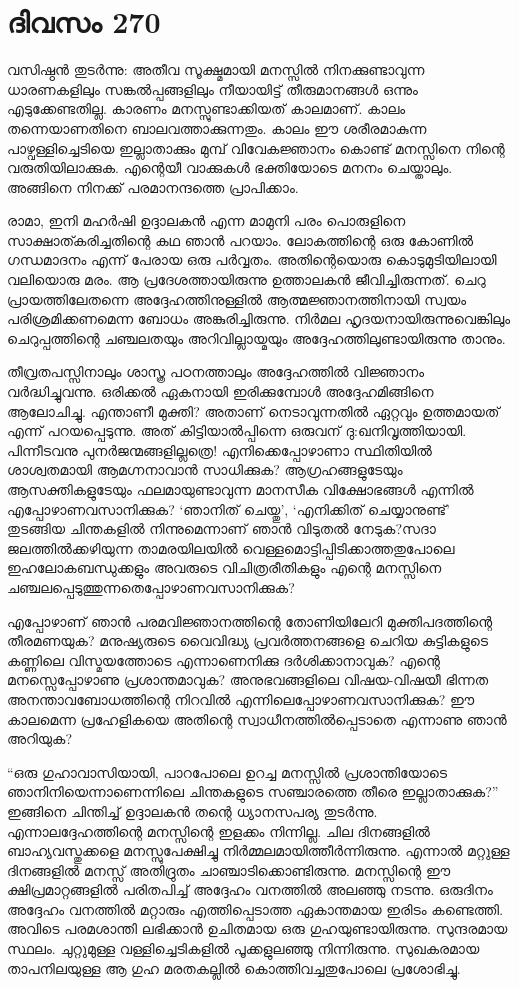 \section{ദിവസം 270}


വസിഷ്ഠന്‍ തുടര്‍ന്നു: അതീവ സൂക്ഷ്മമായി മനസ്സില്‍ നിനക്കുണ്ടാവുന്ന ധാരണകളിലും സങ്കല്‍പ്പങ്ങളിലും നീയായിട്ട് തീരുമാനങ്ങള്‍ ഒന്നും എടുക്കേണ്ടതില്ല. കാരണം മനസ്സുണ്ടാക്കിയത് കാലമാണ്. കാലം തന്നെയാണതിനെ ബാലവത്താക്കുന്നതും. കാലം ഈ ശരീരമാകുന്ന പാഴ്വള്ളിച്ചെടിയെ ഇല്ലാതാക്കും മുമ്പ് വിവേകജ്ഞാനം കൊണ്ട് മനസ്സിനെ നിന്റെ വരുതിയിലാക്കുക. എന്റെയീ വാക്കുകള്‍ ഭക്തിയോടെ മനനം ചെയ്താലും. അങ്ങിനെ നിനക്ക് പരമാനന്ദത്തെ പ്രാപിക്കാം.

രാമാ, ഇനി മഹര്‍ഷി ഉദ്ദാലകന്‍ എന്ന മാമുനി പരം പൊരുളിനെ സാക്ഷാത്കരിച്ചതിന്റെ കഥ ഞാന്‍ പറയാം. ലോകത്തിന്റെ ഒരു കോണില്‍ ഗന്ധമാദനം എന്ന് പേരായ ഒരു പര്‍വ്വതം. അതിന്റെയൊരു കൊടുമുടിയിലായി വലിയൊരു മരം. ആ പ്രദേശത്തായിരുന്നു ഉത്താലകന്‍ ജീവിച്ചിരുന്നത്. ചെറു പ്രായത്തിലേതന്നെ അദ്ദേഹത്തിനുള്ളില്‍  ആത്മജ്ഞാനത്തിനായി സ്വയം പരിശ്രമിക്കണമെന്ന ബോധം അങ്കുരിച്ചിരുന്നു. നിര്‍മല ഹൃദയനായിരുന്നുവെങ്കിലും ചെറുപ്പത്തിന്റെ ചഞ്ചലതയും അറിവില്ലായ്മയും അദ്ദേഹത്തിലുണ്ടായിരുന്നു താനും.  

തീവ്രതപസ്സിനാലും ശാസ്ത്ര പഠനത്താലും അദ്ദേഹത്തില്‍ വിജ്ഞാനം വര്‍ദ്ധിച്ചുവന്നു. ഒരിക്കല്‍ ഏകനായി ഇരിക്കുമ്പോള്‍ അദ്ദേഹമിങ്ങിനെ ആലോചിച്ചു. എന്താണീ മുക്തി? അതാണ്‌ നെടാവുന്നതില്‍ ഏറ്റവും ഉത്തമായത് എന്ന് പറയപ്പെടുന്നു. അത് കിട്ടിയാല്‍പ്പിന്നെ ഒരുവന് ദു:ഖനിവൃത്തിയായി. പിന്നീടവനു പുനര്‍ജന്മങ്ങളില്ലത്രെ! എനിക്കെപ്പോഴാണാ സ്ഥിതിയില്‍ ശാശ്വതമായി ആമഗ്നനാവാന്‍ സാധിക്കുക? ആഗ്രഹങ്ങളുടേയും ആസക്തികളുടേയും ഫലമായുണ്ടാവുന്ന മാനസീക വിക്ഷോഭങ്ങള്‍ എന്നില്‍ എപ്പോഴാണവസാനിക്കുക? ‘ഞാനിത് ചെയ്തു’, ‘എനിക്കിത് ചെയ്യാനുണ്ട്’ തുടങ്ങിയ ചിന്തകളില്‍ നിന്നുമെന്നാണ് ഞാന്‍ വിടുതല്‍ നേടുക?സദാ ജലത്തില്‍ക്കഴിയുന്ന താമരയിലയില്‍ വെള്ളമൊട്ടിപ്പിടിക്കാത്തതുപോലെ ഇഹലോകബന്ധുക്കളും അവരുടെ വിചിത്രരീതികളും എന്റെ മനസ്സിനെ ചഞ്ചലപ്പെടുത്തുന്നതെപ്പോഴാണവസാനിക്കുക?

എപ്പോഴാണ് ഞാന്‍ പരമവിജ്ഞാനത്തിന്റെ തോണിയിലേറി മുക്തിപദത്തിന്റെ തീരമണയുക? മനുഷ്യരുടെ വൈവിദ്ധ്യ പ്രവര്‍ത്തനങ്ങളെ ചെറിയ കുട്ടികളുടെ കണ്ണിലെ വിസ്മയത്തോടെ എന്നാണെനിക്കു ദര്‍ശിക്കാനാവുക? എന്റെ മനസ്സെപ്പോഴാണു പ്രശാന്തമാവുക? അനുഭവങ്ങളിലെ വിഷയ-വിഷയീ ഭിന്നത അനന്താവബോധത്തിന്റെ നിറവില്‍ എന്നിലെപ്പോഴാണവസാനിക്കുക? ഈ കാലമെന്ന പ്രഹേളികയെ അതിന്റെ സ്വാധീനത്തില്‍പ്പെടാതെ എന്നാണു ഞാന്‍ അറിയുക?

“ഒരു ഗുഹാവാസിയായി, പാറപോലെ ഉറച്ച മനസ്സില്‍ പ്രശാന്തിയോടെ ഞാനിനിയെന്നാണെന്നിലെ  ചിന്തകളുടെ സഞ്ചാരത്തെ തീരെ ഇല്ലാതാക്കുക?” ഇങ്ങിനെ ചിന്തിച്ച്  ഉദ്ദാലകന്‍ തന്റെ ധ്യാനസപര്യ തുടര്‍ന്നു. എന്നാലദ്ദേഹത്തിന്റെ മനസ്സിന്റെ ഇളക്കം നിന്നില്ല. ചില ദിനങ്ങളില്‍ ബാഹ്യവസ്തുക്കളെ മനസ്സുപേക്ഷിച്ചു നിര്‍മ്മലമായിത്തീര്‍ന്നിരുന്നു. എന്നാല്‍ മറ്റുള്ള ദിനങ്ങളില്‍ മനസ്സ് അതിദ്രുതം ചാഞ്ചാടിക്കൊണ്ടിരുന്നു. മനസ്സിന്റെ ഈ ക്ഷിപ്രമാറ്റങ്ങളില്‍ പരിതപിച്ച് അദ്ദേഹം വനത്തില്‍ അലഞ്ഞു നടന്നു. ഒരുദിനം അദ്ദേഹം വനത്തില്‍ മറ്റാരും എത്തിപ്പെടാത്ത ഏകാന്തമായ ഇരിടം കണ്ടെത്തി. അവിടെ പരമശാന്തി ലഭിക്കാന്‍ ഉചിതമായ ഒരു ഗുഹയുണ്ടായിരുന്നു. സുന്ദരമായ സ്ഥലം. ചുറ്റുമുള്ള വള്ളിച്ചെടികളില്‍ പൂക്കളുലഞ്ഞു നിന്നിരുന്നു. സുഖകരമായ താപനിലയുള്ള ആ ഗുഹ മരതകല്ലില്‍ കൊത്തിവച്ചതുപോലെ പ്രശോഭിച്ചു.